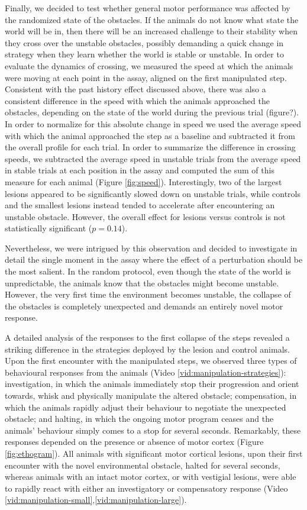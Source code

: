 Finally, we decided to test whether general motor performance was affected by the randomized state of the obstacles. If the animals do not know what state the world will be in, then there will be an increased challenge to their stability when they cross over the unstable obstacles, possibly demanding a quick change in strategy when they learn whether the world is stable or unstable. In order to evaluate the dynamics of crossing, we measured the speed at which the animals were moving at each point in the assay, aligned on the first manipulated step. Consistent with the past history effect discussed above, there was also a consistent difference in the speed with which the animals approached the obstacles, depending on the state of the world during the previous trial (figure?). In order to normalize for this absolute change in speed we used the average speed with which the animal approached the step as a baseline and subtracted it from the overall profile for each trial. In order to summarize the difference in crossing speeds, we subtracted the average speed in unstable trials from the average speed in stable trials at each position in the assay and computed the sum of this measure for each animal (Figure \ref{fig:speed}). Interestingly, two of the largest lesions appeared to be significantly slowed down on unstable trials, while controls and the smallest lesions instead tended to accelerate after encountering an unstable obstacle. However, the overall effect for lesions versus controls is not statistically significant ($p = 0.14$).

Nevertheless, we were intrigued by this observation and decided to investigate in detail the single moment in the assay where the effect of a perturbation should be the most salient. In the random protocol, even though the state of the world is unpredictable, the animals know that the obstacles might become unstable. However, the very first time the environment becomes unstable, the collapse of the obstacles is completely unexpected and demands an entirely novel motor response.

A detailed analysis of the responses to the first collapse of the steps revealed a striking difference in the strategies deployed by the lesion and control animals. Upon the first encounter with the manipulated steps, we observed three types of behavioural responses from the animals (Video \ref{vid:manipulation-strategies}): investigation, in which the animals immediately stop their progression and orient towards, whisk and physically manipulate the altered obstacle; compensation, in which the animals rapidly adjust their behaviour to negotiate the unexpected obstacle; and halting, in which the ongoing motor program ceases and the animals' behaviour simply comes to a stop for several seconds. Remarkably, these responses depended on the presence or absence of motor cortex (Figure \ref{fig:ethogram}). All animals with significant motor cortical lesions, upon their first encounter with the novel environmental obstacle, halted for several seconds, whereas animals with an intact motor cortex, or with vestigial lesions, were able to rapidly react with either an investigatory or compensatory response (Video \ref{vid:manipulation-small},\ref{vid:manipulation-large}).
